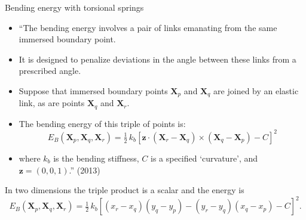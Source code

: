 \documentclass[aspectratio=169,11pt]{beamer}
\begin{document}
\begin{frame}{Bending energy with torsional springs}
\label{fr:torsion}
\small
\begin{itemize}
  \item ``The bending energy involves a pair of links emanating from the same immersed boundary point.
  \item It is designed to penalize deviations in the angle between these links from a prescribed angle.
  \item Suppose that immersed boundary points $\mathbf{X}_p$ and $\mathbf{X}_q$ are joined by an elastic link, as are points $\mathbf{X}_q$ and $\mathbf{X}_r$.
  \item The bending energy of this triple of points is:
\[
  E_B(\mathbf{X}_p, \mathbf{X}_q, \mathbf{X}_r) = \tfrac12\,k_b\left[\mathbf{z}\cdot(\mathbf{X}_r - \mathbf{X}_q)\times(\mathbf{X}_q - \mathbf{X}_p) - C\right]^2
\]
  \item where $k_b$ is the bending stiffness, $C$ is a specified `curvature', and $\mathbf{z} = (0,0,1)$.'' (2013)
\end{itemize}
\vspace{1mm}
\small In two dimensions the triple product is a scalar and the energy is
\[
  E_B(\mathbf{X}_p, \mathbf{X}_q, \mathbf{X}_r) = \tfrac12\,k_b\left[(x_r - x_q)(y_q - y_p) - (y_r - y_q)(x_q - x_p) - C\right]^2 .
\]
\end{frame}
\end{document}
